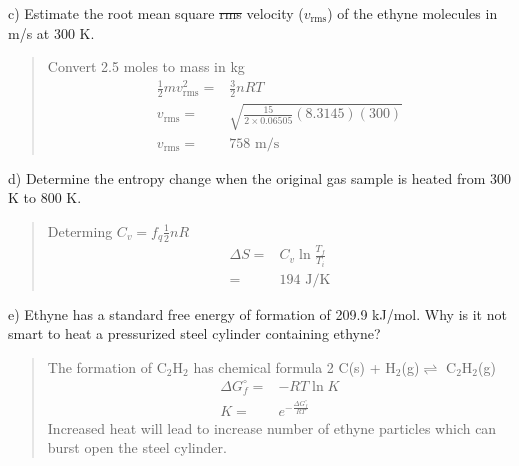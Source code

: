\documentclass[11pt]{article}
\newcommand{\brian}[1]{
  {\begin{quote}
      \color{blue} #1
  \end{quote}}
}
\begin{document}
c) Estimate the {\color{blue} root mean square} {\color{red} \sout{rms}} velocity
{\color{blue}($v_\text{rms}$)} of the ethyne molecules in m/s at 300 K.

\brian{Convert 2.5 moles to mass in kg
  \begin{align*}
    \frac{1}{2}mv^2_\text{rms} = & \frac{3}{2}nRT \\
    v_\text{rms} = & \sqrt{\frac{15}{2\times 0.06505}(8.3145)(300)} \\
    v_\text{rms} = & 758 \text{ m/s}
  \end{align*}
}

d) Determine the entropy change when the original gas sample is heated from 300 K to
800 K.

\brian{Determing $C_v = f_q\frac{1}{2}nR$
  \begin{align*}
    \Delta S = & C_v\ln\frac{T_f}{T_i} \\
    = & 194 \text{ J/K}
  \end{align*}
}

e) Ethyne has a standard free energy of formation of 209.9 kJ/mol. Why is it not smart
to heat a pressurized steel cylinder containing ethyne?

\brian{The formation of C$_2$H$_2$ has chemical formula 2 C(s) + H$_2$(g)$\rightleftharpoons$ C$_2$H$_2$(g)
  \begin{align*}
    \Delta G^\circ_f = & -RT\ln K \\
    K = & e^{-\frac{\Delta G^\circ_f}{RT}}
  \end{align*}
  Increased heat will lead to increase number of ethyne particles which can burst open
  the steel cylinder.
}
\end{document}
